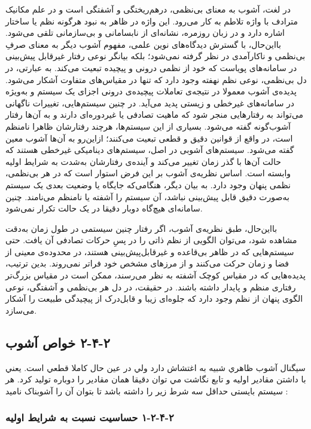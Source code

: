 در لغت، آشوب به معنای بی‌نظمی، درهم‌ریختگی و آشفتگی است و در علم مکانیک مترادف با واژه تلاطم به کار می‌رود. این واژه در ظاهر به نبود هرگونه نظم یا ساختار اشاره دارد و در زبان روزمره، نشانه‌ای از نابسامانی و بی‌سازمانی تلقی می‌شود. بااین‌حال، با گسترش دیدگاه‌های نوین علمی، مفهوم آشوب دیگر به معنای صرفِ بی‌نظمی و ناکارآمدی در نظر گرفته نمی‌شود؛ بلکه بیانگر نوعی رفتار غیرقابل پیش‌بینی در سامانه‌های پویاست که خود از نظمی درونی و پیچیده تبعیت می‌کند. به عبارتی، در دل بی‌نظمی، نوعی نظم نهفته وجود دارد که تنها در مقیاس‌های متفاوت آشکار می‌شود. پدیده‌ی آشوب معمولا در نتیجه‌ی تعاملات پیچیده‌ی درونی اجزای یک سیستم و به‌ویژه در سامانه‌های غیرخطی و زیستی پدید می‌آید. در چنین سیستم‌هایی، تغییرات ناگهانی می‌تواند به رفتارهایی منجر شود که ماهیت تصادفی یا غیر‌دوره‌ای دارند و به آن‌ها رفتار آشوب‌گونه گفته می‌شود. بسیاری از این سیستم‌ها، هرچند رفتارشان ظاهرا نامنظم است، در واقع از قوانین دقیق و قطعی تبعیت می‌کنند؛ ازاین‌رو به آن‌ها آشوب معین گفته می‌شود. سیستم‌های آشوبی در اصل، سیستم‌های دینامیکی غیرخطی هستند که حالت آن‌ها با گذر زمان تغییر می‌کند و آینده‌ی رفتارشان به‌شدت به شرایط اولیه وابسته است. اساس نظریه‌ی آشوب بر این فرض استوار است که در هر بی‌نظمی، نظمی پنهان وجود دارد. به بیان دیگر، هنگامی‌که جایگاه یا وضعیت بعدی یک سیستم به‌صورت دقیق قابل پیش‌بینی نباشد، آن سیستم را آشفته یا نامنظم می‌نامند. چنین سامانه‌ای هیچ‌گاه دوبار دقیقا در یک حالت تکرار نمی‌شود.

بااین‌حال، طبق نظریه‌ی آشوب، اگر رفتار چنین سیستمی در طول زمان به‌دقت مشاهده شود، می‌توان الگویی از نظم ذاتی را در پسِ حرکات تصادفی آن یافت. حتی سیستم‌هایی که در ظاهر بی‌قاعده و غیرقابل‌پیش‌بینی هستند، در محدوده‌ی معینی از فضا و زمان حرکت می‌کنند و از مرزهای مشخص خود فراتر نمی‌روند. بدین ترتیب، پدیده‌هایی که در مقیاس کوچک آشفته به نظر می‌رسند، ممکن است در مقیاس بزرگ‌تر رفتاری منظم و پایدار داشته باشند. در حقیقت، در دل هر بی‌نظمی و آشفتگی، نوعی الگوی پنهان از نظم وجود دارد که جلوه‌ای زیبا و قابل‌درک از پیچیدگی طبیعت را آشکار می‌سازد\cite{ref46}.

\subsection{‏۲‏-‏۴‏-‏۲‏ خواص آشوب}

سيگنال آشوب ظاهري شبيه به اغتشاش  دارد ولي در عين حال كاملا قطعي است. يعني با داشتن مقادير اوليه و تابع نگاشت مي توان دقيقا همان مقادير را دوباره توليد كرد. هر سیستم بایستی حداقل سه شرط زیر را داشته باشد تا بتوان آن را آشوبناک نامید \cite{ref21}:

\subsubsection{‏۲‏-‏۴‏-‏۲‏-‏۱‏ حساسیت نسبت به شرایط اولیه}

